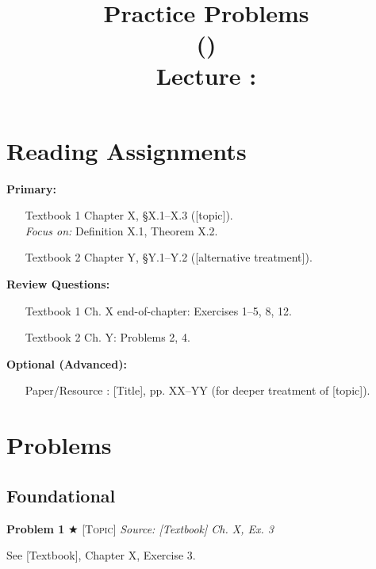 \documentclass[11pt,a4paper]{article}
\title{\textbf{Practice Problems} \\ \coursename{} (\coursenumber) \\ Lecture \lecturenum: \lecturetopic}
\author{}
\date{\semester}
\newcommand{\easy}{{\color{green!70!black}$\bigstar$}}
\begin{document}
\maketitle

\section*{Reading Assignments}

\textbf{Primary:}
\begin{itemize}
  \item [Textbook 1] Chapter X, \S X.1--X.3 ([topic]).\\
        \textit{Focus on:} Definition X.1, Theorem X.2.
  \item [Textbook 2] Chapter Y, \S Y.1--Y.2 ([alternative treatment]).
\end{itemize}

\textbf{Review Questions:}
\begin{itemize}
  \item [Textbook 1] Ch. X end-of-chapter: Exercises 1--5, 8, 12.
  \item [Textbook 2] Ch. Y: Problems 2, 4.
\end{itemize}

\textbf{Optional (Advanced):}
\begin{itemize}
  \item [Paper/Resource]: [Title], pp. XX--YY (for deeper treatment of [topic]).
\end{itemize}

\newpage

\section*{Problems}


\subsection*{Foundational}

\textbf{Problem 1} \easy{} \textsc{[Topic]} \hfill \textit{Source: [Textbook] Ch. X, Ex. 3}

See [Textbook], Chapter X, Exercise 3.
\end{document}
